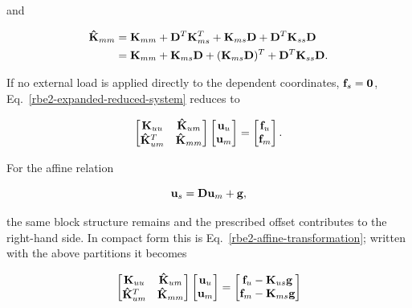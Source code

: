 and

\begin{equation}
\begin{aligned}
    \mathbf{\hat K}_{mm}
    &=\mathbf{K}_{mm}+\mathbf{D}^T\mathbf{K}_{ms}^T
      +\mathbf{K}_{ms}\mathbf{D}+\mathbf{D}^T\mathbf{K}_{ss}\mathbf{D}\\
    &=\mathbf{K}_{mm}+\mathbf{K}_{ms}\mathbf{D}
      +(\mathbf{K}_{ms}\mathbf{D})^T+\mathbf{D}^T\mathbf{K}_{ss}\mathbf{D}.
\end{aligned}
\end{equation}

If no external load is applied directly to the dependent coordinates,
$\mathbf{f}_s=\mathbf{0}$, Eq.~\eqref{rbe2-expanded-reduced-system} reduces to

\begin{equation}
    \begin{bmatrix}
        \mathbf{K}_{uu}&\mathbf{\hat K}_{um}\\
        \mathbf{\hat K}_{um}^T&\mathbf{\hat K}_{mm}
    \end{bmatrix}
    \begin{bmatrix}\mathbf{u}_u\\\mathbf{u}_m\end{bmatrix}
    =
    \begin{bmatrix}\mathbf{f}_u\\\mathbf{f}_m\end{bmatrix}.
\end{equation}

For the affine relation

\begin{equation}
    \mathbf{u}_s=\mathbf{D}\mathbf{u}_m+\mathbf{g},
\end{equation}

the same block structure remains and the prescribed offset contributes to the
right-hand side. In compact form this is Eq.~\eqref{rbe2-affine-transformation};
written with the above partitions it becomes

\begin{equation}
    \begin{bmatrix}
        \mathbf{K}_{uu}&\mathbf{\hat K}_{um}\\
        \mathbf{\hat K}_{um}^T&\mathbf{\hat K}_{mm}
    \end{bmatrix}
    \begin{bmatrix}\mathbf{u}_u\\\mathbf{u}_m\end{bmatrix}
    =
    \begin{bmatrix}
        \mathbf{f}_u-\mathbf{K}_{us}\mathbf{g}\\
        \mathbf{f}_m-\mathbf{K}_{ms}\mathbf{g}
    \end{bmatrix}
\end{equation}

